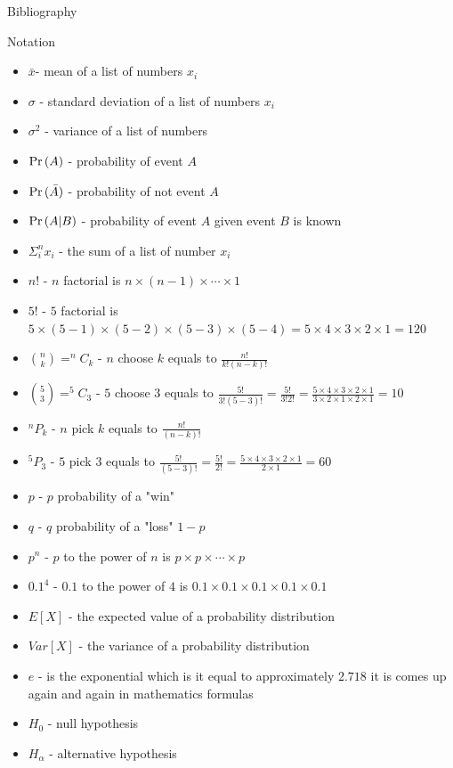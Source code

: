 \documentclass[10pt,a4paper]{article}
\def\Pr{\mathop{\rm Pr}}
\begin{document}
\begin{multicols}{3}
\begin{textbox}{Bibliography}
\end{textbox}
\begin{textbox}{Notation}
\begin{itemize}
\item 
$\bar{x}$- mean of a list of numbers $x_i$
\item 
$\sigma$ - standard deviation of a list of numbers $x_i$
\item 
$\sigma^2$ - variance of a list of numbers 
\item $\Pr{(A)}$ - probability of event $A$
\item $\Pr{(\bar{A})}$ - probability of not event $A$
\item $\Pr{(A|B)}$ - probability of event $A$ given event $B$ is known
\item $\Sigma_{i}^{n}x_i$ - the sum of a list of number $x_i$
\item $n!$ - $n$ factorial is $n\times(n-1)\times\cdots \times 1$
\item $5!$ - $5$ factorial is $5\times(5-1)\times(5-2)\times(5-3)\times(5-4)=5\times4\times3\times2\times 1=120$
\item $\binom{n}{k}=^nC_k $ - $n$ choose $k$ equals to $\frac{n!}{k!(n-k)!}$
\item $\binom{5}{3}=^5C_3 $ - $5$ choose $3$ equals to $\frac{5!}{3!(5-3)!}=\frac{5!}{3!2!}=\frac{5\times 4\times 3 \times 2 \times 1}{3\times 2 \times 1\times 2 \times 1 }=10$
\item $^nP_k $ - $n$ pick $k$ equals to $\frac{n!}{(n-k)!}$
\item $^5P_3 $ - $5$ pick $3$ equals to $\frac{5!}{(5-3)!}=\frac{5!}{2!}=\frac{5\times 4\times 3 \times 2 \times 1}{ 2 \times 1 }=60$
\item $p$ - $p$ probability of a "win"
\item $q$ - $q$ probability of a "loss" $1-p$
\item $p^n$ - $p$ to the power of $n$ is $p\times p\times \cdots \times p$
\item $0.1^4$ - $0.1$ to the power of $4$ is $0.1\times 0.1\times 0.1\times 0.1 \times 0.1$
\item $E[X]$ - the expected value of a probability distribution
\item $Var[X]$ - the variance of a probability distribution
\item $e$ - is the exponential which is it equal to approximately $2.718$ it is comes up again and again in mathematics formulas
\item $H_0$ - null hypothesis 
\item $H_\alpha$ - alternative hypothesis 

\end{itemize}
\end{textbox}
\end{multicols}
\end{document}
